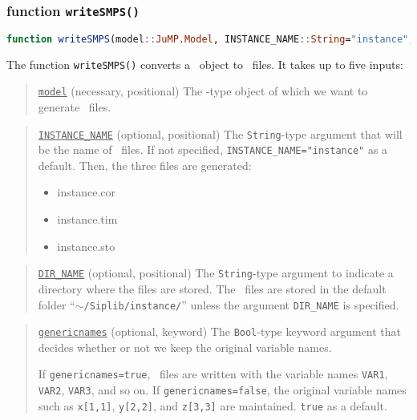 \subsubsection{function \texttt{writeSMPS()}} 
\begin{lstlisting}[frame=single,language=julia]
function writeSMPS(model::JuMP.Model, INSTANCE_NAME::String="instance", DIR_NAME::String="$(dirname(@__FILE__))/../instance"; genericnames::Bool=true, splice::Bool=true)
\end{lstlisting}
The function \texttt{writeSMPS()} converts a \jumpmodel\ object to \smps\ files. It takes up to five inputs:

\begin{quote}
	\noindent\underline{\texttt{model}} (necessary, positional) The \jumpmodel-type object of which we want to generate \smps\ files.
\end{quote}

\begin{quote}
	\noindent\underline{\texttt{INSTANCE\_NAME}} (optional, positional) The \texttt{String}-type argument that will be the name of \smps\ files. If not specified, \texttt{INSTANCE\_NAME="instance"} as a default. Then, the three files are generated:
	\begin{itemize}
		\item instance.cor
		\item instance.tim
		\item instance.sto
	\end{itemize}
\end{quote}

\begin{quote}
	\noindent\underline{\texttt{DIR\_NAME}} (optional, positional) The \texttt{String}-type argument to indicate a directory where the files are stored. The \smps\ files are stored in the default folder ``\texttt{$\sim$/Siplib/instance/}'' unless the argument \texttt{DIR\_NAME} is specified.
\end{quote}

\begin{quote}
	\noindent\underline{\texttt{genericnames}} (optional, keyword) The \texttt{Bool}-type keyword argument that decides whether or not we keep the original variable names. 
	
	If \texttt{genericnames=true}, \smps\ files are written with the variable names \texttt{VAR1}, \texttt{VAR2}, \texttt{VAR3}, and so on. If \texttt{genericnames=false}, the original variable names such as \texttt{x[1,1]}, \texttt{y[2,2]}, and \texttt{z[3,3]} are maintained. \texttt{true} as a default.
\end{quote}

